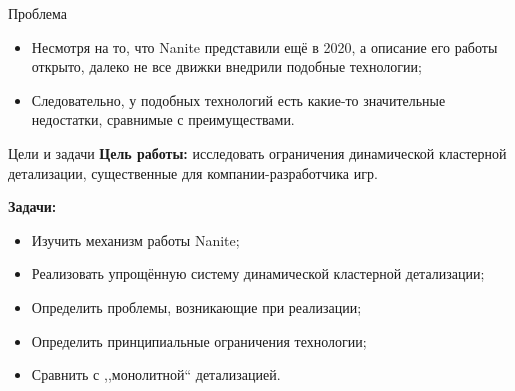 \documentclass{beamer}
\begin{document}
    \begin{frame}{Проблема}
        \begin{itemize}
            \item Несмотря на то,
            что Nanite представили ещё в 2020,
            а описание его работы открыто,
            далеко не все движки внедрили подобные технологии;

            \item Следовательно, у подобных технологий есть
            какие-то значительные недостатки,
            сравнимые с преимуществами.
        \end{itemize}
    \end{frame}

    \begin{frame}{Цели и задачи}
        \textbf{Цель работы:}
        исследовать ограничения динамической кластерной детализации,
        существенные для компании-разработчика игр.

        \bigskip

        \textbf{Задачи:}
        \begin{itemize}
            \item Изучить механизм работы Nanite;
            \item Реализовать упрощённую систему
            динамической кластерной детализации;
            \item Определить проблемы, возникающие при реализации;
            \item Определить принципиальные ограничения технологии;
            \item Сравнить с ,,монолитной`` детализацией.
        \end{itemize}
    \end{frame}
\end{document}
